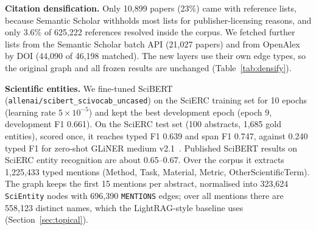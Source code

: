 \documentclass[conference]{IEEEtran}
\begin{document}
\textbf{Citation densification.} Only 10,899 papers (23\%) came with reference lists, because Semantic Scholar withholds most lists for publisher-licensing reasons, and only 3.6\% of 625,222 references resolved inside the corpus. We fetched further lists from the Semantic Scholar batch API (21,027 papers) and from OpenAlex~\cite{priem2022openalex} by DOI (44,090 of 46,198 matched). The new layers use their own edge types, so the original graph and all frozen results are unchanged (Table~\ref{tab:densify}).

\begin{table}[t]
\centering
\caption{Citation graph before and after densification}
\label{tab:densify}
\end{table}

\textbf{Scientific entities.} We fine-tuned SciBERT (\texttt{allenai/scibert\_scivocab\_uncased}) on the SciERC training set for 10 epochs (learning rate $5\times10^{-5}$) and kept the best development epoch (epoch 9, development F1 0.661). On the SciERC test set (100 abstracts, 1,685 gold entities), scored once, it reaches typed F1 0.639 and span F1 0.747, against 0.240 typed F1 for zero-shot GLiNER medium v2.1~\cite{zaratiana2024gliner}. Published SciBERT results on SciERC entity recognition are about 0.65--0.67. Over the corpus it extracts 1,225,433 typed mentions (Method, Task, Material, Metric, OtherScientificTerm). The graph keeps the first 15 mentions per abstract, normalised into 323,624 \texttt{SciEntity} nodes with 696,390 \texttt{MENTIONS} edges; over all mentions there are 558,123 distinct names, which the LightRAG-style baseline uses (Section~\ref{sec:topical}).
\end{document}
